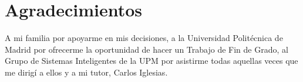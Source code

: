 \cleardoublepage
{}
\chapter*{Agradecimientos}
A mi familia por apoyarme en mis decisiones, a la Universidad Politécnica de Madrid por ofrecerme la oportunidad de hacer un Trabajo de Fin de Grado, al Grupo de Sistemas Inteligentes de la UPM por asistirme todas aquellas veces que me dirigí a ellos y a mi tutor, Carlos Iglesias.